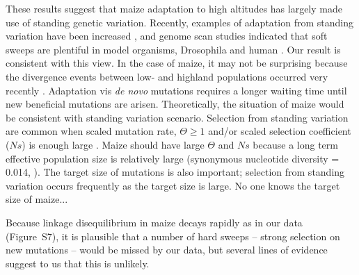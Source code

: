 {{These results suggest that maize adaptation to high altitudes has largely made use of standing genetic variation. 
Recently, examples of adaptation from standing variation have been increased \cite[Reviewed in ][]{Barrett_2008_18006185,Messer_2013_24075201}, and
genome scan studies indicated that soft sweeps are plentiful in model organisms, Drosophila \cite[]{Garud_2013_ArXiv} and human \cite[]{Turchin_2012_22902787,Peter_2012_23071458}.
Our result is consistent with this view.
In the case of maize, it may not be surprising because the divergence events between low- and highland populations occurred very recently \cite[]{Piperno_2006_69,Perry_2006_16511492,Grobman_2012_22307642}.
Adaptation vis \emph{de novo} mutations requires a longer waiting time until new beneficial mutations are arisen.
Theoretically, the situation of maize would be consistent with standing variation scenario.
Selection from standing variation are common when scaled mutation rate, $\Theta\geq1$ and/or scaled selection coefficient ($Ns$) is enough large \cite[]{Hermisson_2005_15716498}.
Maize should have large $\Theta$ and $Ns$ because a long term effective population size is relatively large (synonymous nucleotide diversity = 0.014, \cite[\emph{e.g.,} ][]{Tenaillon_2004_15014173,Wright_2005_15919994,Ross-Ibarra_2009_19153259}).
The target size of mutations is also important; selection from standing variation occurs frequently as the target size is large.
No one knows the target size of maize...


Because linkage disequilibrium in maize decays rapidly \cite[]{Remington_2001_11562485,Tenaillon_2001_11470895} as in our data (Figure~S7), it is plausible that a number of hard sweeps -- strong selection on new mutations -- would be missed by our data, but several lines of evidence suggest to us that this is unlikely.  

}}
